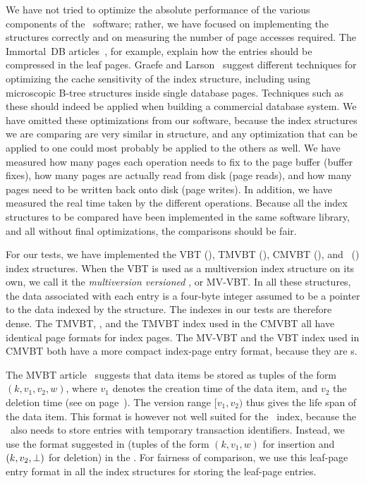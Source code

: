 We have not tried to optimize the absolute performance of the various
components of the \TreeLib\ software; rather, we have focused on
implementing the structures correctly and on measuring the number of  
page accesses required. 
The Immortal~DB
articles~\cite{lomet:2006:transactiontime,lomet:2005:immortaldb}, 
for example, explain how the entries should be compressed in the
leaf pages.
Graefe and Larson~\cite{graefe:2001:cache} suggest different
techniques for optimizing the cache sensitivity of the index
structure, including using microscopic B-tree structures inside
single database pages. 
Techniques such as these should indeed be applied when building a
commercial database system.
We have omitted these optimizations from our software, because the index
structures we are comparing are very similar in structure, and any
optimization that can be applied to one could most probably be applied to the
others as well.
We have measured how many pages each operation needs to fix to the
page buffer (buffer fixes), how many pages are actually read from
disk (page reads), and how many pages need to be written back onto
disk (page writes).
In addition, we have measured the real time taken by the different
operations.
Because all the index structures to be compared have been
implemented in the same software library, and all without final
optimizations, the comparisons should be fair.

For our tests, we have implemented the VBT (),
TMVBT (), CMVBT (), and \TSBtree\
() index structures.
When the VBT is used as a multiversion index structure on its own, we call it
the \emph{multiversion versioned \Btree}, or MV-VBT.
In all these structures, the data associated with each entry is a four-byte
integer assumed to be a pointer to the data indexed by the structure.
The indexes in our tests are therefore dense. 
The TMVBT, \TSBtree, and the TMVBT index used in the CMVBT all have identical
page formats for index pages.
The MV-VBT and the VBT index used in CMVBT both have a more compact
index-page entry format, because they are \Btree{}s.
 
The MVBT article~\cite{becker:1996:mvbt} suggests that data items be
stored as tuples of the form $(k,v_1,v_2,w)$, where $v_1$ denotes the
creation time of the data item, and $v_2$ the deletion time (see
\defref{def:lifespan} on page~\pageref{def:lifespan}).
The version range $[v_1, v_2)$ thus gives the life span of the data item.
This format is however not well suited for the \TSBtree\ index, because the
\TSBtree\ also needs to store entries with temporary transaction
identifiers.
Instead, we use the format suggested in 
(tuples of the form $(k, v_1, w)$ for insertion and $(k, v_2, \bot)$
for deletion) in the \TSBtree. 
For fairness of comparison, we use this leaf-page entry format in all the
index structures for storing the leaf-page entries.


